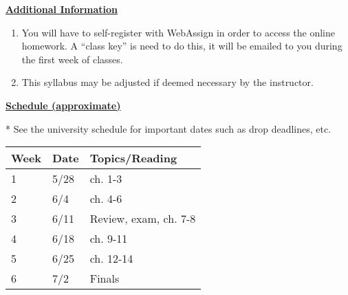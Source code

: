 \documentclass[12pt]{article}
\begin{document}
\underline{\textbf{Additional Information}} \par
\begin{enumerate}
\item You will have to self-register with WebAssign in order to access the online homework.
A “class key” is need to do this, it will be emailed to you during the first week of classes.
\item This syllabus may be adjusted if deemed necessary by the instructor.
\end{enumerate}

\pagebreak

\underline{\textbf{Schedule (approximate)}} \par
* See the university schedule for important dates such as drop deadlines, etc.
\begin{longtable}{| p{} | p{} | p{} |}
\hline
Week & Date & Topics/Reading \\ \hline
1 & 5/28 & ch. 1-3 \\ \hline
2 & 6/4 & ch. 4-6 \\ \hline
3 & 6/11 & Review, exam, ch. 7-8 \\ \hline
4 & 6/18 & ch. 9-11 \\ \hline
5 & 6/25 & ch. 12-14 \\ \hline
6 & 7/2 & Finals \\ \hline
\end{longtable}
\end{document}
